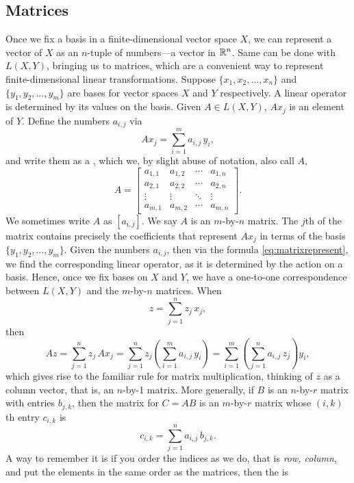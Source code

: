 \subsection{Matrices}

Once we fix a basis in a finite-dimensional
vector space $X$, we can represent a vector of $X$ as an $n$-tuple of
numbers---a vector in ${\mathbb{R}}^n$.
Same can be done with $L(X,Y)$, bringing us to matrices,
which are a convenient way to represent
finite-dimensional linear transformations.
Suppose $\{ x_1, x_2, \ldots, x_n \}$ and $\{ y_1, y_2, \ldots, y_m \}$
are bases for vector spaces $X$ and $Y$ respectively.  A linear operator is 
determined by its values on the basis.  Given $A \in L(X,Y)$,
$A x_j$ is an element of $Y$.  Define the numbers
$a_{i,j}$ via
\begin{equation} \label{eq:matrixrepresent}
A x_j = \sum_{i=1}^m a_{i,j} \, y_i ,
\end{equation}
and write them as a \emph{},
which we, by slight abuse of notation, also call $A$,
\begin{equation*}
A =
\begin{bmatrix}
a_{1,1} & a_{1,2} & \cdots & a_{1,n} \\
a_{2,1} & a_{2,2} & \cdots & a_{2,n} \\
\vdots & \vdots & \ddots & \vdots \\
a_{m,1} & a_{m,2} & \cdots & a_{m,n}
\end{bmatrix} .
\end{equation*}
We sometimes write $A$ as $[a_{i,j}]$.
We say $A$ is an $m$-by-$n$ matrix.
The $j$th \emph{} of the matrix contains precisely the coefficients
that represent $A x_j$ in terms of the basis $\{ y_1,y_2,\ldots,y_m \}$.
Given the numbers $a_{i,j}$, then via the formula
\eqref{eq:matrixrepresent}, we find the corresponding linear operator,
as it is determined by the action on a basis.  Hence, once we fix
bases on $X$ and $Y$, we have a one-to-one correspondence between
$L(X,Y)$ and the $m$-by-$n$ matrices.
When
\begin{equation*}
z = \sum_{j=1}^n z_j \, x_j ,
\end{equation*}
then
\begin{equation*}
A z =
\sum_{j=1}^n z_j \, A x_j 
=
\sum_{j=1}^n z_j \left( \sum_{i=1}^m  a_{i,j}\, y_i \right) 
=
\sum_{i=1}^m \left(\sum_{j=1}^n  a_{i,j}\, z_j \right) y_i ,
\end{equation*}
which gives rise to the familiar rule for matrix multiplication,
thinking of $z$ as a column vector, that is, an $n$-by-1 matrix.
%
More generally, if $B$ is an $n$-by-$r$ matrix with entries $b_{j,k}$, then 
the matrix for $C = AB$ is an $m$-by-$r$ matrix whose $(i,k)$th entry
$c_{i,k}$ is
\begin{equation*}
c_{i,k} =
\sum_{j=1}^n a_{i,j}\,b_{j,k} .
\end{equation*}
A way to remember it is if you order the indices as we do, that is
\emph{row, column}, and put the elements in the same order as the matrices,
then the  is 

